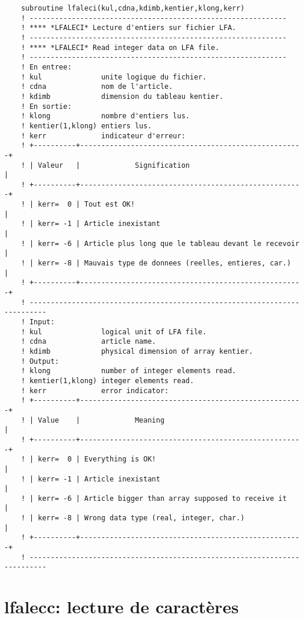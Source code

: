 \documentclass[10pt,french]{book}
\begin{document}
\begin{verbatim}
	subroutine lfaleci(kul,cdna,kdimb,kentier,klong,kerr)
	! -------------------------------------------------------------                
	! **** *LFALECI* Lecture d'entiers sur fichier LFA.
	! -------------------------------------------------------------                
	! **** *LFALECI* Read integer data on LFA file.
	! -------------------------------------------------------------                
	! En entree:
	! kul              unite logique du fichier.
	! cdna             nom de l'article.
	! kdimb            dimension du tableau kentier.
	! En sortie:
	! klong            nombre d'entiers lus.
	! kentier(1,klong) entiers lus.
	! kerr             indicateur d'erreur:
	! +----------+-----------------------------------------------------+
	! | Valeur   |             Signification                           |
	! +----------+-----------------------------------------------------+
	! | kerr=  0 | Tout est OK!                                        |
	! | kerr= -1 | Article inexistant                                  |
	! | kerr= -6 | Article plus long que le tableau devant le recevoir |
	! | kerr= -8 | Mauvais type de donnees (reelles, entieres, car.)   |
	! +----------+-----------------------------------------------------+
	! --------------------------------------------------------------------------
	! Input:
	! kul              logical unit of LFA file.
	! cdna             article name.
	! kdimb            physical dimension of array kentier.
	! Output:
	! klong            number of integer elements read.
	! kentier(1,klong) integer elements read.
	! kerr             error indicator:
	! +----------+-----------------------------------------------------+
	! | Value    |             Meaning                                 |
	! +----------+-----------------------------------------------------+
	! | kerr=  0 | Everything is OK!                                   |
	! | kerr= -1 | Article inexistant                                  |
	! | kerr= -6 | Article bigger than array supposed to receive it    |
	! | kerr= -8 | Wrong data type (real, integer, char.)              |
	! +----------+-----------------------------------------------------+
	! --------------------------------------------------------------------------
\end{verbatim}
\section{lfalecc: lecture de caractères}
 
\end{document}
